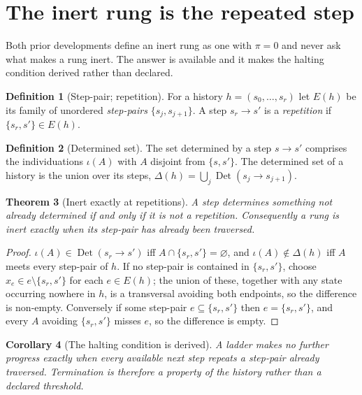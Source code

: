 \documentclass[11pt,a4paper]{article}
\theoremstyle{clthm}
\newtheorem{theorem}{Theorem}[section]
\newtheorem{corollary}[theorem]{Corollary}
\theoremstyle{definition}
\newtheorem{definition}[theorem]{Definition}
\theoremstyle{remark}
\newcommand{\pow}{\pi}
\newcommand{\Det}{\operatorname{Det}}
\newcommand{\Dl}{\Delta}
\begin{document}
\section{The inert rung is the repeated step}
\label{sec:inert}

Both prior developments define an inert rung as one with $\pow=0$ and
never ask what makes a rung inert. The answer is available and it makes
the halting condition derived rather than declared.

\begin{definition}[Step-pair; repetition]
\label{def:steppair}
For a history $h=(s_0,\dots,s_r)$ let $E(h)$ be its family of unordered
\emph{step-pairs} $\{s_j,s_{j+1}\}$. A step $s_r\to s'$ is a
\emph{repetition} if $\{s_r,s'\}\in E(h)$.
\end{definition}

\begin{definition}[Determined set]
\label{def:det}
The set determined by a step $s\to s'$ comprises the individuations
$\iota(A)$ with $A$ disjoint from $\{s,s'\}$. The determined set of a
history is the union over its steps, $\Dl(h)=\bigcup_j\Det(s_j\to
s_{j+1})$.
\end{definition}

\begin{theorem}[Inert exactly at repetitions]
\label{thm:inert-repeat}
A step determines something not already determined if and only if it is
not a repetition. Consequently a rung is inert exactly when its step-pair
has already been traversed.
\end{theorem}

\begin{proof}
$\iota(A)\in\Det(s_r\to s')$ iff $A\cap\{s_r,s'\}=\varnothing$, and
$\iota(A)\notin\Dl(h)$ iff $A$ meets every step-pair of $h$. If no
step-pair is contained in $\{s_r,s'\}$, choose $x_e\in
e\setminus\{s_r,s'\}$ for each $e\in E(h)$; the union of these, together
with any state occurring nowhere in $h$, is a transversal avoiding both
endpoints, so the difference is non-empty. Conversely if some step-pair
$e\subseteq\{s_r,s'\}$ then $e=\{s_r,s'\}$, and every $A$ avoiding
$\{s_r,s'\}$ misses $e$, so the difference is empty.
\end{proof}

\begin{corollary}[The halting condition is derived]
\label{cor:halt}
A ladder makes no further progress exactly when every available next step
repeats a step-pair already traversed. Termination is therefore a property
of the history rather than a declared threshold.
\end{corollary}
\end{document}
